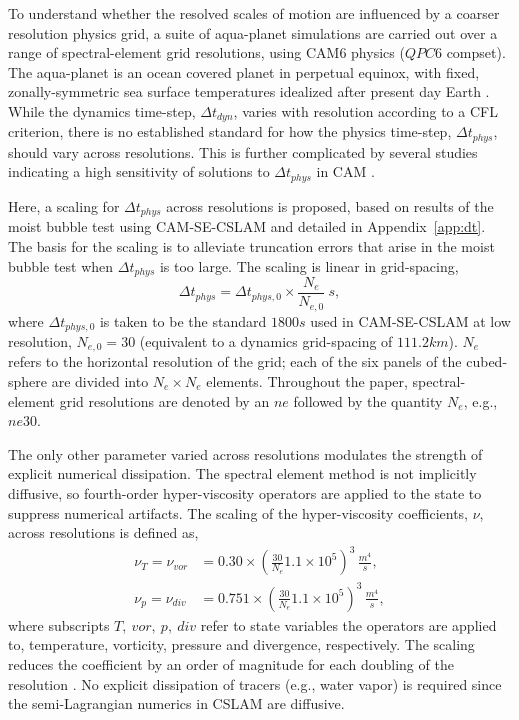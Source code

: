 \documentclass{agujournal}
\begin{document}
To understand whether the resolved scales of motion are influenced by a coarser resolution physics grid, a suite of aqua-planet simulations \citep{NH2000ASL,MWO2016JAMES} are carried out over a range of spectral-element grid resolutions, using CAM6 physics ($QPC6$ compset). The aqua-planet is an ocean covered planet in perpetual equinox, with fixed, zonally-symmetric sea surface temperatures idealized after present day Earth \citep[$QOBS$ in][]{NH2000ASL}. While the dynamics time-step, $\Delta t_{dyn}$, varies with resolution according to a CFL criterion, there is no established standard for how the physics time-step, $\Delta t_{phys}$, should vary across resolutions. This is further complicated by several studies indicating a high sensitivity of solutions to $\Delta t_{phys}$ in CAM  \citep{WO2003QJR,W2013QJRMS,WETAL2015JAMES,HR2018JAMES}.

Here, a scaling for $\Delta t_{phys}$ across resolutions is proposed, based on results of the moist bubble test \citep{HR2018JAMES} using CAM-SE-CSLAM and detailed in Appendix~\ref{app:dt}. The basis for the scaling is to alleviate truncation errors that arise in the moist bubble test when $\Delta t_{phys}$ is too large. The scaling is linear in grid-spacing,
\begin{equation}
\Delta t_{phys} = \Delta t_{phys,0} \times \frac{N_e}{N_{e,0}}~s,\label{eq:dt-scale}
\end{equation}
where $\Delta t_{phys,0}$ is taken to be the standard $1800 s$ used in CAM-SE-CSLAM at low resolution, $N_{e,0} = 30$ (equivalent to a dynamics grid-spacing of $111.2km$). $N_e$ refers to the horizontal resolution of the grid; each of the six panels of the cubed-sphere are divided into $N_e \times N_e$ elements. Throughout the paper, spectral-element grid resolutions are denoted by an $ne$ followed by the quantity $N_e$, e.g., $ne30$.

The only other parameter varied across resolutions modulates the strength of explicit numerical dissipation. The spectral element method is not implicitly diffusive, so fourth-order hyper-viscosity operators are applied to the state to suppress numerical artifacts. The scaling of the hyper-viscosity coefficients, $\nu$, across resolutions is defined as,
\begin{align}
\nu_T = \nu_{vor} &= 0.30\times \left(\frac{30}{N_e}1.1\times 10^5\right)^3\, \frac{m^4}{s}, \\
\nu_p = \nu_{div} &= 0.751\times \left(\frac{30}{N_e}1.1\times 10^5\right)^3\, \frac{m^4}{s},
\label{eq:hypervis}
\end{align}
where subscripts $T,~vor,~p,~div$ refer to state variables the operators are applied to, temperature, vorticity, pressure and divergence, respectively. The scaling reduces the coefficient by an order of magnitude for each doubling of the resolution \citep[as in][]{LetAl2018JAMES}. No explicit dissipation of tracers (e.g., water vapor) is required since the semi-Lagrangian numerics in CSLAM are diffusive.
\end{document}

